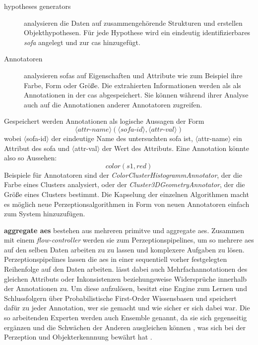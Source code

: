 \begin{description}
\item[hypotheses generators] analysieren die Daten auf zusammengehörende Strukturen und erstellen Objekthypothesen. Für jede Hypothese wird ein eindeutig identifizierbares \textit{\gls{sofa}} angelegt und zur \gls{cas} hinzugefügt.
\item[Annotatoren] analysieren \glspl{sofa} auf Eigenschaften und Attribute wie zum Beispiel ihre Farbe, Form oder Größe. Die extrahierten Informationen werden als als Annotationen in der \gls{cas} abgespeichert. Sie können während ihrer Analyse auch auf die Annotationen anderer Annotatoren zugreifen.\end{description} Gespeichert werden Annotationen als logische Aussagen der Form 
\begin{displaymath}
\langle attr\text{-}name \rangle (\langle sofa\text{-}id \rangle , \langle attr\text{-}val \rangle)
\end{displaymath}
wobei $\langle$sofa-id$\rangle$ der eindeutige Name des untersuchten \gls{sofa} ist, $\langle$attr-name$\rangle$ ein Attribut des \gls{sofa} und $\langle$attr-val$\rangle$ der Wert des Attributs. Eine Annotation könnte also so Aussehen: 
\begin{displaymath}
color(s1, red)
\end{displaymath}
Beispiele für Annotatoren sind der \textit{ColorClusterHistogrammAnnotator}, der die Farbe eines Clusters analysiert, oder der \textit{Cluster3DGeometryAnnotator}, der die Größe eines Clusters bestimmt. Die Kapselung der einzelnen Algorithmen macht es möglich neue Perzeptionsalgorithmen in Form von neuen Annotatoren einfach zum System hinzuzufügen. \par
\textbf{aggregate \glspl{ae}} bestehen aus mehreren primitve und aggregate \glspl{ae}. Zusammen mit einem \textit{flow-controller} werden sie zum Perzeptionspipelines, um so mehrere \glspl{ae} auf den selben Daten arbeiten zu zu lassen und komplexere Aufgaben zu lösen. Perzeptionspipelines lassen die \glspl{ae} in einer sequentiell vorher festgelegten Reihenfolge auf den Daten arbeiten. \robosherlock lässt dabei auch Mehrfachannotationen des gleichen Attributs oder Inkonsistenzen beziehungsweise Widersprüche innerhalb der Annotationen zu. Um diese aufzulösen, besitzt \robosherlock eine Engine zum Lernen und Schlussfolgern über Probabilistische First-Order Wissensbasen und speichert dafür zu jeder Annotation, wer sie gemacht und wie sicher er sich dabei war. Die so arbeitenden Experten werden auch Ensemble genannt, da sie sich gegenseitig ergänzen und die Schwächen der Anderen ausgleichen können \cite{polikar}, was sich bei der Perzeption und Objekterkennnung bewährt hat \cite{multimodalTemplate, atrBasedObjIden, pronobis1, pr2looking}.  
  

